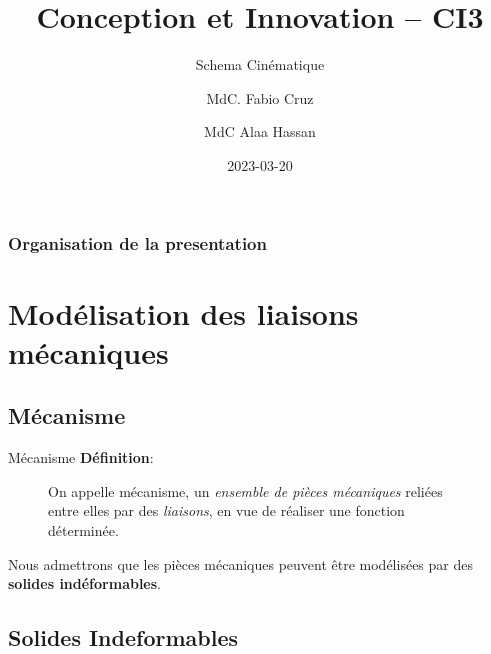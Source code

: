 \documentclass[
  ignorenonframetext,
  aspectratio=169,
  c]{beamer}
\title{Conception et Innovation -- CI3}
\subtitle{Schema Cinématique}
\author{MdC. Fabio Cruz \and MdC Alaa Hassan}
\date{2023-03-20}
\institute{Université de Lorraine \textbar{} ENSGSI}
\renewcommand*\contentsname{Table of contents}
\newcommand\contentsname{Table of contents}
\begin{document}
\frame{\titlepage}

\renewcommand*\contentsname{Organisation de la presentation}
\begin{frame}[allowframebreaks]
  \frametitle{Organisation de la presentation}
  \tableofcontents[hideallsubsections]
\end{frame}
\section{Modélisation des liaisons
mécaniques}\label{moduxe9lisation-des-liaisons-muxe9caniques}

\subsection{Mécanisme}\label{muxe9canisme}

\begin{frame}{Mécanisme}
\textbf{Définition}:

\begin{figure}

\begin{minipage}{0.68\linewidth}
On appelle mécanisme, un \emph{ensemble de pièces mécaniques} reliées
entre elles par des \emph{liaisons}, en vue de réaliser une fonction
déterminée.\end{minipage}%

\end{figure}%

\pause

Nous admettrons que les pièces mécaniques peuvent être modélisées par
des \textbf{solides indéformables}.
\end{frame}

\subsection{Solides Indeformables}\label{solides-indeformables}
\end{document}
